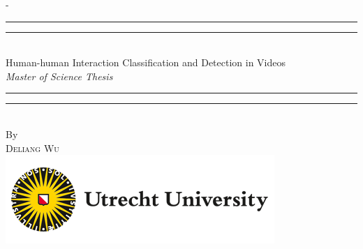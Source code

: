%
%
% 
%
%
\begin{titlingpage}
\begin{SingleSpace}
\calccentering{\unitlength} 
\begin{adjustwidth*}{\unitlength}{-\unitlength}
\vspace*{6mm}
\begin{center}
\rule[0.5ex]{\linewidth}{2pt}\vspace*{-\baselineskip}\vspace*{3.2pt}
\rule[0.5ex]{\linewidth}{1pt}\\[\baselineskip]
{\HUGE Human-human Interaction Classification and Detection in Videos}\\[6mm]
{\Large \textit{Master of Science Thesis}}\\
\rule[0.5ex]{\linewidth}{1pt}\vspace*{-\baselineskip}\vspace{3.2pt}
\rule[0.5ex]{\linewidth}{2pt}\\
\vspace{6.5mm}
{\large By}\\
{\large\textsc{Deliang Wu}}\\
\vspace{5mm}
\includegraphics[scale=0.8]{logos/uu.png}\\
\vspace{3mm}

\end{center}
\end{adjustwidth*}
\end{SingleSpace}
\end{titlingpage}
